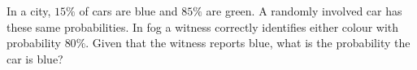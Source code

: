 In a city, $15\%$ of cars are blue and $85\%$ are green. A randomly involved car has these same probabilities. In fog a witness correctly identifies either colour with probability $80\%$. Given that the witness reports blue, what is the probability the car is blue?
